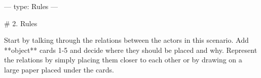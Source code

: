 ---
type: Rules
---

# 2. Rules

Start by talking through the relations between the actors in this scenario.
Add **object** cards 1-5 and decide where they should be placed and why.
Represent the relations by simply placing them closer to each other or by drawing on a large paper placed under the cards.

